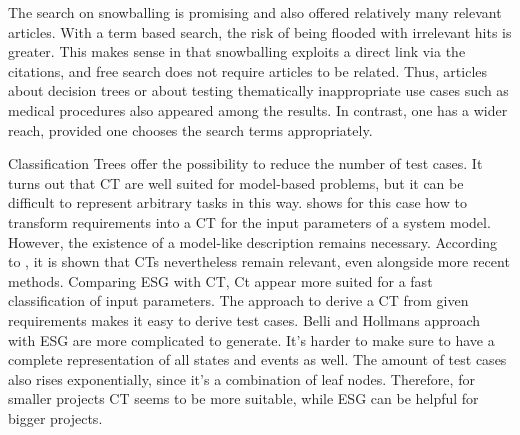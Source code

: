 The search on snowballing is promising and also offered relatively many relevant articles. With a term based search, the risk of being flooded with irrelevant hits is greater. This makes sense in that snowballing exploits a direct link via the citations, and free search does not require articles to be related. Thus, articles about decision trees or about testing thematically inappropriate use cases such as medical procedures also appeared among the results. In contrast, one has a wider reach, provided one chooses the search terms appropriately.

Classification Trees offer the possibility to reduce the number of test cases. It turns out that CT are well suited for model-based problems, but it can be difficult to represent arbitrary tasks in this way.  \cite{Conrad2005} shows for this case how to transform requirements into a CT for the input parameters of a system model. However, the existence of a model-like description remains necessary. According to \cite{Belli2009}, it is shown that CTs nevertheless remain relevant, even alongside more recent methods. Comparing ESG with CT, Ct appear more suited for a fast classification of input parameters. The approach to derive a CT from given requirements makes it easy to derive test cases. Belli and Hollmans approach with ESG are more complicated to generate. It's harder to make sure to have a complete representation of all states and events as well. The amount of test cases also rises exponentially, since it's a combination of leaf nodes. Therefore, for smaller projects CT seems to be more suitable, while ESG can be helpful for bigger projects.







